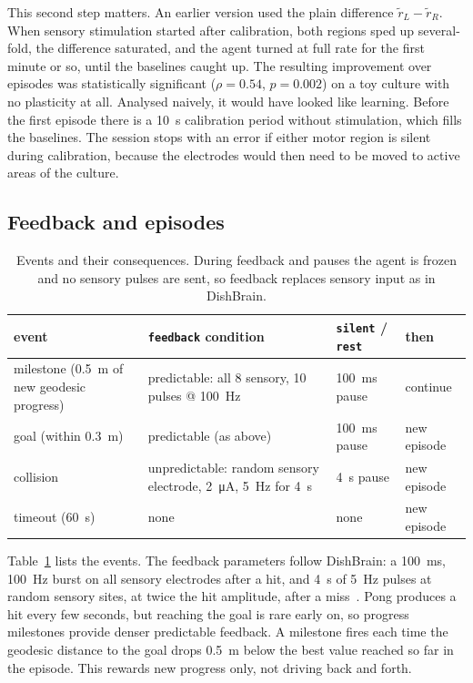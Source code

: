 \documentclass[11pt,a4paper]{article}
\newcommand{\code}[1]{\texttt{#1}}
\begin{document}
This second step matters. An earlier version used the plain difference
$\tilde r_L-\tilde r_R$. When sensory stimulation started after calibration, both regions sped
up several-fold, the difference saturated, and the agent turned at full rate for the first
minute or so, until the baselines caught up. The resulting improvement over episodes was
statistically significant ($\rho=0.54$, $p=0.002$) on a toy culture with no plasticity at all.
Analysed naively, it would have looked like learning. Before the first episode
there is a \SI{10}{\second} calibration period without stimulation, which fills the baselines.
The session stops with an error if either motor region is silent during calibration, because
the electrodes would then need to be moved to active areas of the culture.

\subsection{Feedback and episodes}

\begin{table}[t]
\centering\small
\begin{tabular}{@{}p{3.6cm}p{5.4cm}p{2.4cm}p{2cm}@{}}
\toprule
event & \code{feedback} condition & \code{silent} / \code{rest} & then \\
\midrule
milestone (\SI{0.5}{\metre} of new geodesic progress) & predictable: all 8 sensory, 10 pulses @ \SI{100}{\hertz} & \SI{100}{\milli\second} pause & continue \\
goal (within \SI{0.3}{\metre}) & predictable (as above) & \SI{100}{\milli\second} pause & new episode \\
collision & unpredictable: random sensory electrode, \SI{2}{\micro\ampere}, \SI{5}{\hertz} for \SI{4}{\second} & \SI{4}{\second} pause & new episode \\
timeout (\SI{60}{\second}) & none & none & new episode \\
\bottomrule
\end{tabular}
\caption{Events and their consequences. During feedback and pauses the agent is frozen and no
sensory pulses are sent, so feedback replaces sensory input as in DishBrain.}
\label{tab:feedback}
\end{table}

Table~\ref{tab:feedback} lists the events. The feedback parameters follow DishBrain: a
\SI{100}{\milli\second}, \SI{100}{\hertz} burst on all sensory electrodes after a hit, and
\SI{4}{\second} of \SI{5}{\hertz} pulses at random sensory sites, at twice the hit amplitude,
after a miss~\citep{kagan2022dishbrain,khajehnejad2024sample}. Pong produces a hit every few
seconds, but reaching the goal is rare early on, so progress milestones provide denser
predictable feedback. A milestone fires each time the geodesic distance to the goal drops
\SI{0.5}{\metre} below the best value reached so far in the episode. This rewards new progress
only, not driving back and forth.
\end{document}
